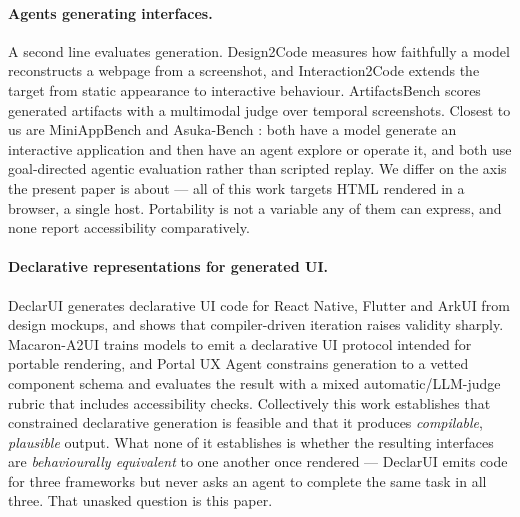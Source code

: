 \documentclass{article}
\begin{document}
\paragraph{Agents generating interfaces.}
A second line evaluates generation. Design2Code \cite{design2code2025} measures
how faithfully a model reconstructs a webpage from a screenshot, and
Interaction2Code \cite{interaction2code2025} extends the target from static
appearance to interactive behaviour. ArtifactsBench \cite{artifactsbench2025}
scores generated artifacts with a multimodal judge over temporal screenshots.
Closest to us are MiniAppBench \cite{miniappbench2026} and Asuka-Bench
\cite{asukabench2026}: both have a model generate an interactive application and
then have an agent explore or operate it, and both use goal-directed agentic
evaluation rather than scripted replay. We differ on the axis the present paper
is about --- all of this work targets HTML rendered in a browser, a single host.
Portability is not a variable any of them can express, and none report
accessibility comparatively.

\paragraph{Declarative representations for generated UI.}
DeclarUI \cite{declarui2025} generates declarative UI code for React Native,
Flutter and ArkUI from design mockups, and shows that compiler-driven iteration
raises validity sharply. Macaron-A2UI \cite{macarona2ui2026} trains models to
emit a declarative UI protocol intended for portable rendering, and Portal UX
Agent \cite{portalux2025} constrains generation to a vetted component schema and
evaluates the result with a mixed automatic/LLM-judge rubric that includes
accessibility checks. Collectively this work establishes that constrained
declarative generation is feasible and that it produces \emph{compilable},
\emph{plausible} output. What none of it establishes is whether the resulting
interfaces are \emph{behaviourally equivalent} to one another once rendered ---
DeclarUI emits code for three frameworks but never asks an agent to complete the
same task in all three. That unasked question is this paper.
\end{document}
